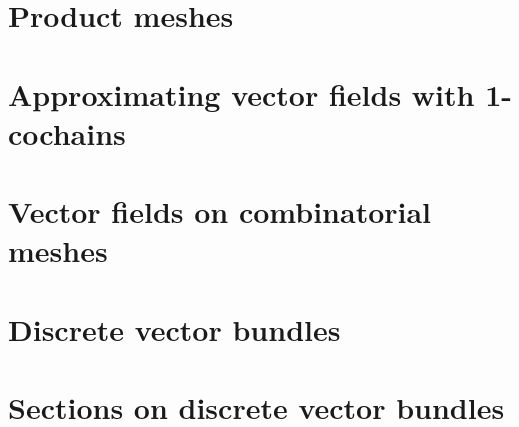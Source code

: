 \documentclass{article}
\theoremstyle{definition}
\begin{document}
\section{Product meshes}
\label{section:product_meshes}


\section{Approximating vector fields with 1-cochains}
\label{section:approximating_vector_fields_with_1_cochains}













\section{Vector fields on combinatorial meshes}
\label{section:vector_fields_on_combinatorial_meshes}






\section{Discrete vector bundles}
\label{section:discrete_vector_bundles}


\section{Sections on discrete vector bundles}
\label{section:sections_on_discrete_vector bundles}

\end{document}
